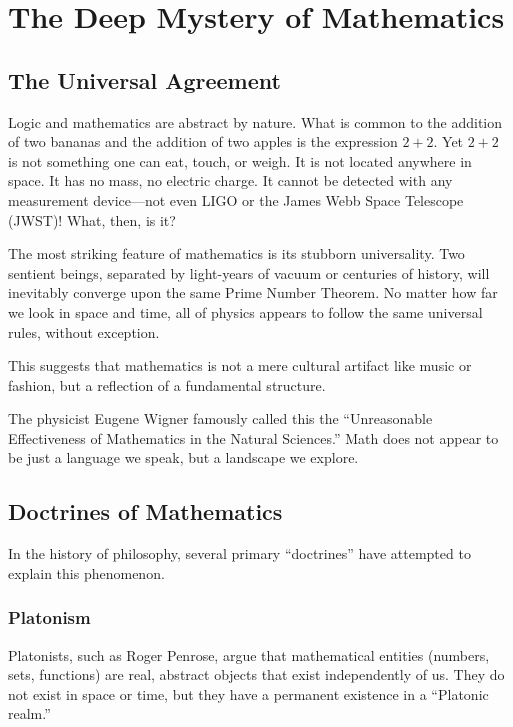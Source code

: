 \chapter{The Deep Mystery of Mathematics}
\label{chap:doctrines-of-math}

\section{The Universal Agreement}

Logic and mathematics are abstract by nature.
What is common to the addition of two bananas and the addition of two apples is the expression $2+2$.
Yet $2+2$ is not something one can eat, touch, or weigh.
It is not located anywhere in space.
It has no mass, no electric charge.
It cannot be detected with any measurement device---not even LIGO or the James Webb Space Telescope (JWST)! What, then, is it?

The most striking feature of mathematics is its stubborn universality. 
Two sentient beings, separated by light-years of vacuum or centuries of history, will inevitably converge upon the same Prime Number Theorem.
No matter how far we look in space and time, all of physics appears to follow the same universal rules, without exception.

This suggests that mathematics is not a mere cultural artifact like music or fashion, but a reflection of a fundamental structure.

The physicist Eugene Wigner famously called this the ``Unreasonable Effectiveness of Mathematics in the Natural Sciences.''
Math does not appear to be just a language we speak, but a landscape we explore.

\section{Doctrines of Mathematics}

In the history of philosophy, several primary ``doctrines'' have attempted to explain this phenomenon.

\subsection*{Platonism}

Platonists, such as Roger Penrose, argue that mathematical entities (numbers, sets, functions) are real, abstract objects that exist independently of us.
They do not exist in space or time, but they have a permanent existence in a ``Platonic realm.''

